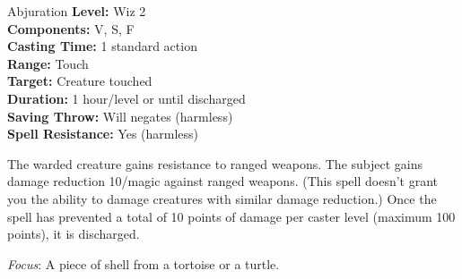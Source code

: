 {Abjuration}
{
	\textbf{Level:}
	Wiz 2\\
	\textbf{Components:}
	V, S, F\\
	\textbf{Casting Time:}
	1 standard action\\
	\textbf{Range:}
	Touch\\
	\textbf{Target:}
	Creature touched\\
	\textbf{Duration:}
	1 hour/level or until discharged\\
	\textbf{Saving Throw:}
	Will negates (harmless)\\
	\textbf{Spell Resistance:}
	Yes (harmless)\\
}
{
	The warded creature gains resistance to ranged weapons. The subject gains damage reduction 10/magic against ranged weapons. (This spell doesn't grant you the ability to damage creatures with similar damage reduction.) Once the spell has prevented a total of 10 points of damage per caster level (maximum 100 points), it is discharged.

	\textit{Focus}:
	A piece of shell from a tortoise or a turtle.

}

